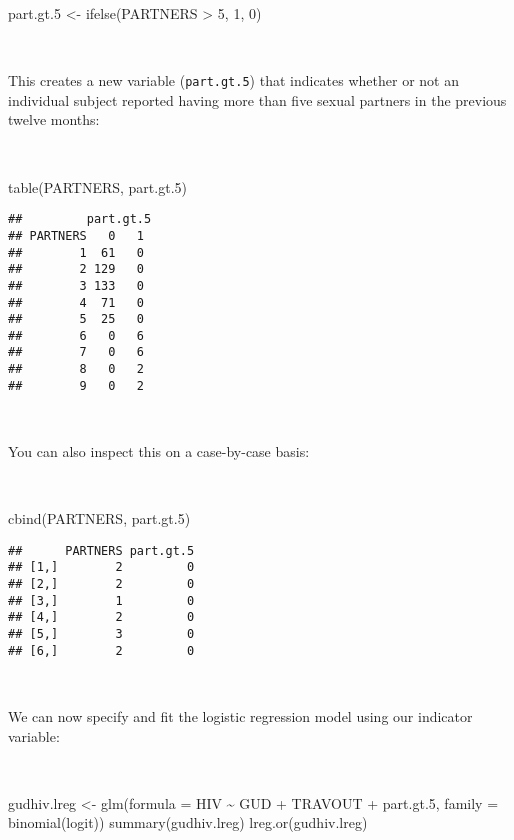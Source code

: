 \documentclass[
  12pt,
  a4paper]{book}
\newenvironment{Shaded}{\begin{snugshade}}{\end{snugshade}}
\newcommand{\AttributeTok}[1]{\textcolor[rgb]{0.77,0.63,0.00}{#1}}
\newcommand{\DecValTok}[1]{\textcolor[rgb]{0.00,0.00,0.81}{#1}}
\newcommand{\FloatTok}[1]{\textcolor[rgb]{0.00,0.00,0.81}{#1}}
\newcommand{\FunctionTok}[1]{\textcolor[rgb]{0.00,0.00,0.00}{#1}}
\newcommand{\NormalTok}[1]{#1}
\newcommand{\OtherTok}[1]{\textcolor[rgb]{0.56,0.35,0.01}{#1}}
\newcommand{\SpecialCharTok}[1]{\textcolor[rgb]{0.00,0.00,0.00}{#1}}
\begin{document}
\begin{Shaded}
\begin{Highlighting}[]
\NormalTok{part.gt}\FloatTok{.5} \OtherTok{\textless{}{-}} \FunctionTok{ifelse}\NormalTok{(PARTNERS }\SpecialCharTok{\textgreater{}} \DecValTok{5}\NormalTok{, }\DecValTok{1}\NormalTok{, }\DecValTok{0}\NormalTok{)}
\end{Highlighting}
\end{Shaded}

~

This creates a new variable (\texttt{part.gt.5}) that indicates whether or not an individual subject reported having more than five sexual partners in the previous twelve months:

~

\begin{Shaded}
\begin{Highlighting}[]
\FunctionTok{table}\NormalTok{(PARTNERS, part.gt}\FloatTok{.5}\NormalTok{)}
\end{Highlighting}
\end{Shaded}

\begin{verbatim}
##         part.gt.5
## PARTNERS   0   1
##        1  61   0
##        2 129   0
##        3 133   0
##        4  71   0
##        5  25   0
##        6   0   6
##        7   0   6
##        8   0   2
##        9   0   2
\end{verbatim}

~

You can also inspect this on a case-by-case basis:

~

\begin{Shaded}
\begin{Highlighting}[]
\FunctionTok{cbind}\NormalTok{(PARTNERS, part.gt}\FloatTok{.5}\NormalTok{)}
\end{Highlighting}
\end{Shaded}

\begin{verbatim}
##      PARTNERS part.gt.5
## [1,]        2         0
## [2,]        2         0
## [3,]        1         0
## [4,]        2         0
## [5,]        3         0
## [6,]        2         0
\end{verbatim}

~

We can now specify and fit the logistic regression model using our indicator variable:

~

\begin{Shaded}
\begin{Highlighting}[]
\NormalTok{gudhiv.lreg }\OtherTok{\textless{}{-}} \FunctionTok{glm}\NormalTok{(}\AttributeTok{formula =}\NormalTok{ HIV }\SpecialCharTok{\textasciitilde{}}\NormalTok{ GUD }\SpecialCharTok{+}\NormalTok{ TRAVOUT }\SpecialCharTok{+}\NormalTok{ part.gt}\FloatTok{.5}\NormalTok{,}
                   \AttributeTok{family =} \FunctionTok{binomial}\NormalTok{(logit))}
\FunctionTok{summary}\NormalTok{(gudhiv.lreg)}
\FunctionTok{lreg.or}\NormalTok{(gudhiv.lreg)}
\end{Highlighting}
\end{Shaded}
\end{document}
